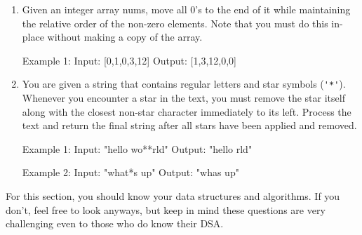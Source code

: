 \begin{enumerate}
\begin{consolethree}
Example 1:
Input: 58 
Output: "LVIII"
\end{consolethree}
\newpage


\item
Given an integer array nums, move all 0's to the end of it while maintaining the relative order of the non-zero elements.
Note that you must do this in-place without making a copy of the array.

\begin{consolethree}
Example 1:
Input: [0,1,0,3,12]
Output: [1,3,12,0,0]
\end{consolethree}
\newpage


\item You are given a string that contains regular letters and star symbols
  (\verb!'*'!).
Whenever you encounter a star in the text, you must remove the star itself along with the closest non-star character immediately to its left. Process the text and return the final string after all stars have been applied and removed.

\begin{consolethree}
Example 1:
Input: "hello wo**rld" 
Output: "hello rld"

Example 2:
Input: "what*s up"
Output: "whas up"
\end{consolethree}
\newpage
 

\end{enumerate}

\newpage
For this section, you should know your data structures and algorithms. If you don't, feel free to look anyways, but keep in mind these questions are very challenging even to those who do know their DSA.\\\\


